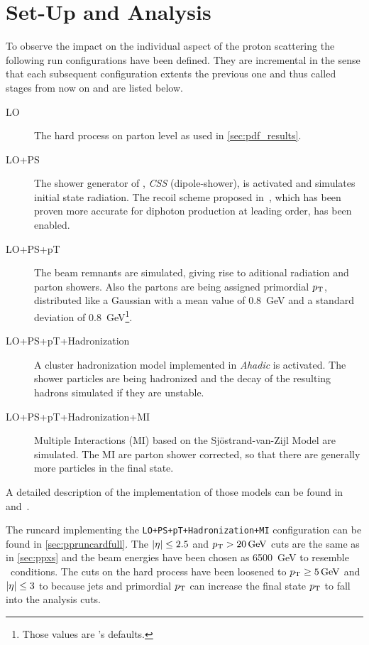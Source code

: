 \section{Set-Up and Analysis}%
\label{sec:setupan}

To observe the impact on the individual aspect of the proton
scattering the following run configurations have been defined. They
are incremental in the sense that each subsequent configuration
extents the previous one and thus called stages from now on and are
listed below.
%
\begin{description}
\item[LO] The hard process on parton level as used in \cref{sec:pdf_results}.
\item[LO+PS] The shower generator of \sherpa, \emph{CSS}
  (dipole-shower), is activated and simulates initial state
  radiation. The recoil scheme proposed in~\cite{hoeche2009:ha}, which
  has been proven more accurate for diphoton production at leading
  order, has been enabled.
\item[LO+PS+pT] The beam remnants are simulated, giving rise to
  aditional radiation and parton showers.  Also the partons are being
  assigned primordial \(p_\mathrm{T}\), distributed like a Gaussian with a mean
  value of \SI{.8}{\giga\electronvolt} and a standard deviation of
  \SI{.8}{\giga\electronvolt}\footnote{Those values are \sherpa 's
    defaults.}.
\item[LO+PS+pT+Hadronization] A cluster hadronization model
  implemented in \emph{Ahadic} is activated. The shower particles are
  being hadronized and the decay of the resulting hadrons simulated if
  they are unstable.
\item[LO+PS+pT+Hadronization+MI] Multiple Interactions (MI) based on
  the Sj\"ostrand-van-Zijl Model are simulated. The MI are parton
  shower corrected, so that there are generally more particles in the
  final state.
\end{description}
%
A detailed description of the implementation of those models can be
found in~\cite{Gleisberg:2008ta} and~\cite{Bothmann:2019yzt}.

The runcard implementing the \texttt{LO+PS+pT+Hadronization+MI}
configuration can be found in \cref{sec:ppruncardfull}. The
\(\abs{\eta}\leq 2.5\) and \(p_\mathrm{T} > \SI{20}{\giga\electronvolt}\) cuts
are the same as in \cref{sec:ppxs} and the beam energies have been
chosen as \SI{6500}{\giga\electronvolt} to resemble \lhc\ conditions.
The cuts on the hard process have been loosened to
\(p_\mathrm{T} \geq \SI{5}{\giga\electronvolt}\) and \(\abs{\eta}\leq 3\) to
because jets and primordial \(p_\mathrm{T}\) can increase the final state
\(p_\mathrm{T}\) to fall into the analysis cuts.

